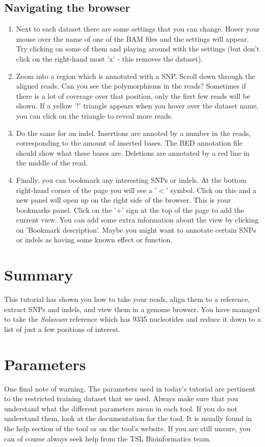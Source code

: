 \documentclass[12pt,a4paper]{article}
\begin{document}
\subsection{Navigating the browser}
\begin{enumerate}
	\item Next to each dataset there are some settings that you
          can change. Hover your mouse over the name of one of the BAM
          files and the settings will appear. Try clicking on some of
          them and playing around with the settings (but don't click
          on the right-hand most 'x' - this removes the dataset).
	\item Zoom into a region which is annotated with a SNP. Scroll
          down through the aligned reads. Can you see the
          polymorphisms in the reads? Sometimes if there is a lot of
          coverage over that position, only the first few reads will
          be shown. If a yellow '!' triangle appears when you hover
          over the dataset name, you can click on the triangle to
          reveal more reads.
	\item Do the same for an indel. Insertions are annoted by a
          number in the reads, corresponding to the amount of inserted
          bases. The BED annotation file should show what these bases
          are. Deletions are annotated by a red line in the middle of
          the read.
	\item Finally, you can bookmark any interesting SNPs or
          indels. At the bottom right-hand corner of the page you will
          see a '$<$' symbol. Click on this and a new panel will open
          up on the right side of the browser. This is your bookmarks
          panel. Click on the '+' sign at the top of the page to add
          the current view. You can add some extra information about
          the view by clicking on 'Bookmark description'. Maybe you
          might want to annotate certain SNPs or indels as having some
          known effect or function.
\end{enumerate}

\section{Summary}

This tutorial has shown you how to take your reads, align them to a
reference, extract SNPs and indels, and view them in a genome
browser. You have managed to take the \emph{Solanum} reference which has
9335 nucleotides and reduce it down to a list of just a few positions
of interest.

\section{Parameters}

One final note of warning. The parameters used in today's tutorial are
pertinent to the restricted training dataset that we used. Always make
sure that you understand what the different parameters mean in each
tool. If you do not understand them, look at the documentation for the
tool. It is usually found in the help section of the tool or on the
tool's website. If you are still unsure, you can of course always seek
help from the TSL Bioinformatics team.
	
\end{document}
